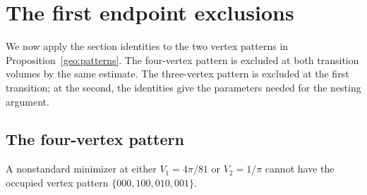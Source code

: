 \section{The first endpoint exclusions}
\label{slice:early-exclusions}

We now apply the section identities to the two vertex patterns in
Proposition~\ref{geo:patterns}.  The four-vertex pattern is excluded at
both transition volumes by the same estimate.  The three-vertex pattern
is excluded at the first transition; at the second, the identities give
the parameters needed for the nesting argument.

\subsection{The four-vertex pattern}

\begin{proposition}\label{slice:four-vertex}
A nonstandard minimizer at either $V_1=4\pi/81$ or $V_2=1/\pi$
cannot have the occupied vertex pattern
$\{000,100,010,001\}$.
\end{proposition}

